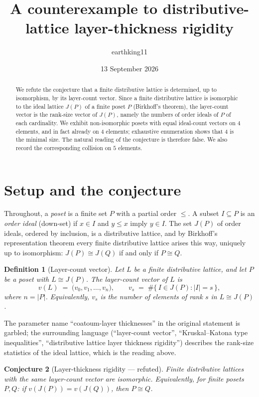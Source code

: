 \documentclass[11pt]{article}
\title{A counterexample to distributive-lattice layer-thickness rigidity}
\author{earthking11}
\date{13 September 2026}
\newtheorem{definition}{Definition}[section]
\newtheorem{conjecture}[definition]{Conjecture}
\theoremstyle{remark}
\begin{document}
\maketitle

\begin{abstract}
We refute the conjecture that a finite distributive lattice is determined, up to
isomorphism, by its layer-count vector.  Since a finite distributive lattice is
isomorphic to the ideal lattice $J(P)$ of a finite poset $P$ (Birkhoff's theorem),
the layer-count vector is the rank-size vector of $J(P)$, namely the numbers of
order ideals of $P$ of each cardinality.  We exhibit non-isomorphic posets with
equal ideal-count vectors on $4$ elements, and in fact already on $4$ elements;
exhaustive enumeration shows that $4$ is the minimal size.  The natural reading of
the conjecture is therefore false.  We also record the corresponding collision on
$5$ elements.
\end{abstract}

\section{Setup and the conjecture}

Throughout, a \emph{poset} is a finite set $P$ with a partial order $\le$.  A
subset $I \subseteq P$ is an \emph{order ideal} (down-set) if $x \in I$ and
$y \le x$ imply $y \in I$.  The set $J(P)$ of order ideals, ordered by inclusion,
is a distributive lattice, and by Birkhoff's representation theorem every finite
distributive lattice arises this way, uniquely up to isomorphism: $J(P) \cong J(Q)$
if and only if $P \cong Q$.

\begin{definition}[Layer-count vector]
Let $L$ be a finite distributive lattice, and let $P$ be a poset with
$L \cong J(P)$.  The \emph{layer-count vector} of $L$ is
\[
  v(L) \;=\; \bigl(v_0, v_1, \dots, v_n\bigr), \qquad
  v_s \;=\; \#\{\, I \in J(P) : |I| = s \,\},
\]
where $n = |P|$.  Equivalently, $v_s$ is the number of elements of rank $s$ in
$L \cong J(P)$.
\end{definition}

The parameter name ``coatoum-layer thicknesses'' in the original statement is
garbled; the surrounding language (``layer-count vector'', ``Kruskal--Katona type
inequalities'', ``distributive lattice layer thickness rigidity'') describes the
rank-size statistics of the ideal lattice, which is the reading above.

\begin{conjecture}[Layer-thickness rigidity --- refuted]
\label{conj}
Finite distributive lattices with the same layer-count vector are isomorphic.
Equivalently, for finite posets $P, Q$: if $v(J(P)) = v(J(Q))$, then
$P \cong Q$.
\end{conjecture}
\end{document}
